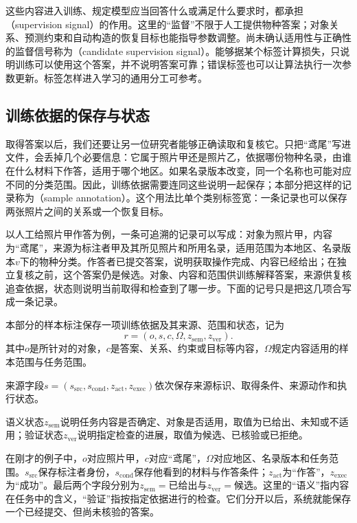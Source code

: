 这些内容进入训练、规定模型应当回答什么或满足什么要求时，都承担（supervision signal）的作用。这里的“监督”不限于人工提供物种答案；对象关系、预测约束和自动构造的恢复目标也能指导参数调整。尚未确认适用性与正确性的监督信号称为（candidate supervision signal）。能够据某个标签计算损失，只说明训练可以使用这个答案，并不说明答案可靠；错误标签也可以让算法执行一次参数更新。标签怎样进入学习的通用分工可参考。

\subsection{训练依据的保存与状态}
\label{sec:knowledge-acquisition-record-status}

取得答案以后，我们还要让另一位研究者能够正确读取和复核它。只把“鸢尾”写进文件，会丢掉几个必要信息：它属于照片甲还是照片乙，依据哪份物种名录，由谁在什么材料下作答，适用于哪个地区。如果名录版本改变，同一个名称也可能对应不同的分类范围。因此，训练依据需要连同这些说明一起保存；本部分把这样的记录称为（sample annotation）。这个用法比单个类别标签宽：一条记录也可以保存两张照片之间的关系或一个恢复目标。

以人工给照片甲作答为例，一条可追溯的记录可以写成：对象为照片甲，内容为“鸢尾”，来源为标注者甲及其所见照片和所用名录，适用范围为本地区、名录版本$v$下的物种分类。作答者已提交答案，说明获取操作完成、内容已经给出；在独立复核之前，这个答案仍是候选。对象、内容和范围供训练解释答案，来源供复核追查依据，状态则说明当前取得和检查到了哪一步。下面的记号只是把这几项合写成一条记录。

\begin{definition}[样本标注]
  \label{def:knowledge-acquisition-record}
  本部分的样本标注保存一项训练依据及其来源、范围和状态，记为
  \[
    r=(o,s,c,\Omega,z_{\mathrm{sem}},z_{\mathrm{ver}}).
  \]
  其中$o$是所针对的对象，$c$是答案、关系、约束或目标等内容，$\Omega$规定内容适用的样本范围与任务范围。

  来源字段$s=(s_{\mathrm{src}},s_{\mathrm{cond}},z_{\mathrm{act}},z_{\mathrm{exec}})$依次保存来源标识、取得条件、来源动作和执行状态。

  语义状态$z_{\mathrm{sem}}$说明任务内容是否确定、对象是否适用，取值为已给出、未知或不适用；验证状态$z_{\mathrm{ver}}$说明指定检查的进展，取值为候选、已核验或已拒绝。
\end{definition}

在刚才的例子中，$o$对应照片甲，$c$对应“鸢尾”，$\Omega$对应地区、名录版本和任务范围。$s_{\mathrm{src}}$保存标注者身份，$s_{\mathrm{cond}}$保存他看到的材料与作答条件；$z_{\mathrm{act}}$为“作答”，$z_{\mathrm{exec}}$为“成功”。最后两个字段分别为$z_{\mathrm{sem}}=\text{已给出}$与$z_{\mathrm{ver}}=\text{候选}$。这里的“语义”指内容在任务中的含义，“验证”指按指定依据进行的检查。它们分开以后，系统就能保存一个已经提交、但尚未核验的答案。

